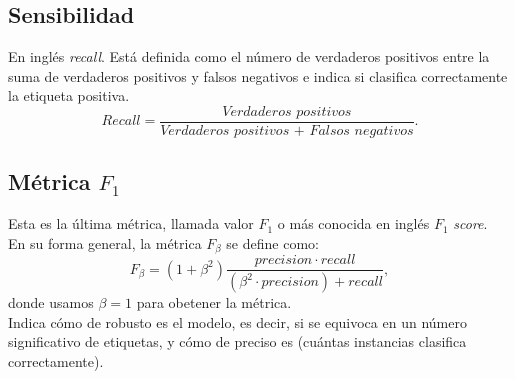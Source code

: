\subsection{Sensibilidad}
En inglés \textit{recall}. Está definida como el número de verdaderos positivos entre la suma de verdaderos positivos y falsos negativos e indica si clasifica correctamente la etiqueta positiva.
\[ Recall=\frac{\textit{Verdaderos positivos}}{\textit{Verdaderos positivos + Falsos negativos}}. \]
\subsection{Métrica $F_1$}
Esta es la última métrica, llamada valor $F_1$ o más conocida en inglés $F_1$ \textit{score}.\\
En su forma general, la métrica $F_\beta$ se define como:
\[ F_\beta=(1+\beta^2) \frac{precision \cdot recall}{(\beta^2 \cdot precision)+recall}, \]
donde usamos $\beta=1$ para obetener la métrica.\\
Indica cómo de robusto es el modelo, es decir, si se equivoca en un número significativo de etiquetas, y cómo de preciso es (cuántas instancias clasifica correctamente).


























\endinput











